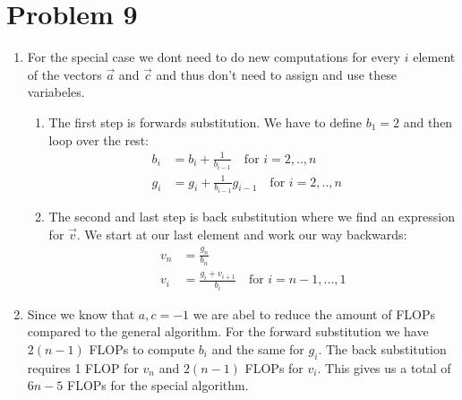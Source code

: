 \documentclass[english,notitlepage]{revtex4-1}  %
\begin{document}
\section*{Problem 9}
\begin{enumerate}[label= \alph*)]
  \item For the special case we dont need to do new computations for every $i$ element of the vectors $\vec{a}$ and $\vec{c}$ and thus don't need to assign and use these variabeles.
  \begin{enumerate}[label=\roman*)]
    \item The first step is forwards substitution. We have to define $b_1 = 2$ and then loop over the rest:
    \begin{align*}
      b_i &= b_i + \frac{1}{b_{i-1}} \quad  \text{for }i=2,..,n \quad\\
      g_i &= g_i + \frac{1}{b_{i-1}}g_{i-1} \quad  \text{for } i = 2,..,n \quad
    \end{align*}
    \item The second and last step is back substitution where we find an expression for $\vec{v}$. We start at our last element and work our way backwards:
    \begin{align*}
      v_n &= \frac{g_n}{b_n} \\
      v_i &= \frac{g_i + v_{i+1}}{b_i} \quad \text{for } i = n-1,...,1
    \end{align*}
  \end{enumerate}
  \item Since we know that $a,c = -1$ we are abel to reduce the amount of FLOPs compared to the general algorithm. For the forward substitution we have $2(n-1)$ FLOPs to compute $b_i$ and the same for $g_i$. The back substitution requires 1 FLOP for $v_n$ and $2(n-1)$ FLOPs for $v_i$. This gives us a total of $6n-5$ FLOPs for the special algorithm.
\end{enumerate}
\end{document}
